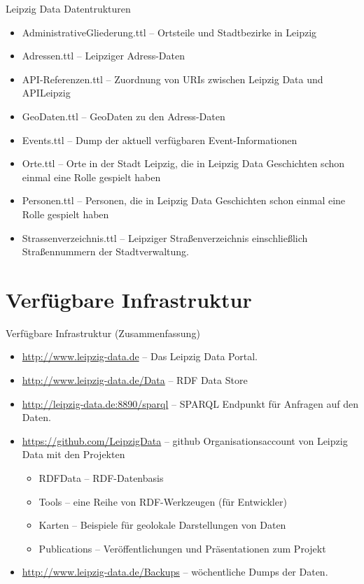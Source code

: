 \documentclass{beamer}
\begin{document}
\begin{frame}{Leipzig Data Datentrukturen}\small
\begin{itemize}
\item AdministrativeGliederung.ttl -- Ortsteile und Stadtbezirke in Leipzig 
\item Adressen.ttl -- Leipziger Adress-Daten
\item API-Referenzen.ttl -- Zuordnung von URIs zwischen Leipzig Data und
  APILeipzig  
\item GeoDaten.ttl -- GeoDaten zu den Adress-Daten
\item Events.ttl -- Dump der aktuell verfügbaren Event-Informationen
\item Orte.ttl -- Orte in der Stadt Leipzig, die in Leipzig Data Geschichten
  schon einmal eine Rolle gespielt haben
\item Personen.ttl -- Personen, die in Leipzig Data Geschichten schon einmal
  eine Rolle gespielt haben
\item Strassenverzeichnis.ttl -- Leipziger Straßenverzeichnis einschließlich
  Straßennummern der Stadtverwaltung. 
\end{itemize}
\end{frame}

\section{Verfügbare Infrastruktur}
\begin{frame}{Verfügbare Infrastruktur (Zusammenfassung)}{}\small
\begin{itemize}\itemsep0pt
\item \url{http://www.leipzig-data.de} – Das Leipzig Data Portal.
\item \url{http://www.leipzig-data.de/Data} – RDF Data Store 
\item \url{http://leipzig-data.de:8890/sparql} – SPARQL Endpunkt für Anfragen
  auf den Daten.
\item \url{https://github.com/LeipzigData} – github Organisationsaccount von
  Leipzig Data mit den Projekten
  \begin{itemize}
  \item RDFData – RDF-Datenbasis
  \item Tools – eine Reihe von RDF-Werkzeugen (für Entwickler)
  \item Karten – Beispiele für geolokale Darstellungen von Daten
  \item Publications -- Veröffentlichungen und Präsentationen zum Projekt
  \end{itemize}
\item \url{http://www.leipzig-data.de/Backups} – wöchentliche Dumps der
  Daten.
\end{itemize}
\end{frame}
\end{document}
